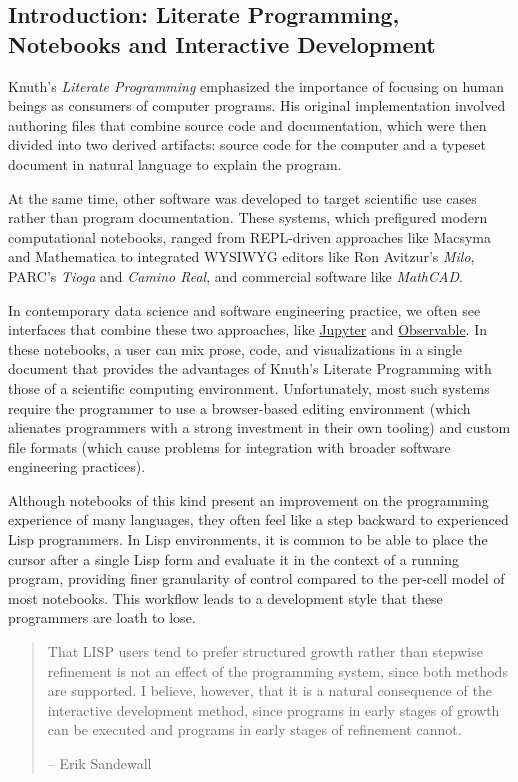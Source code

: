 \documentclass[
]{article}
\begin{document}
\hypertarget{id}{%
\subsection{Introduction: Literate Programming, Notebooks and Interactive Development}\label{id}}

Knuth's \emph{Literate Programming}  emphasized the importance of focusing on human beings as consumers of computer programs. His original implementation involved authoring files that combine source code and documentation, which were then divided into two derived artifacts: source code for the computer and a typeset document in natural language to explain the program.

At the same time, other software was developed to target scientific use cases rather than program documentation. These systems, which prefigured modern computational notebooks, ranged from REPL-driven approaches like Macsyma and Mathematica to integrated WYSIWYG editors like Ron Avitzur's \emph{Milo}, PARC's \emph{Tioga} and \emph{Camino Real}, and commercial software like \emph{MathCAD}.

In contemporary data science and software engineering practice, we often see interfaces that combine these two approaches, like \href{https://jupyter.org}{Jupyter} and \href{https://observablehq.com}{Observable}. In these notebooks, a user can mix prose, code, and visualizations in a single document that provides the advantages of Knuth's Literate Programming with those of a scientific computing environment. Unfortunately, most such systems require the programmer to use a browser-based editing environment (which alienates programmers with a strong investment in their own tooling) and custom file formats (which cause problems for integration with broader software engineering practices).

Although notebooks of this kind present an improvement on the programming experience of many languages, they often feel like a step backward to experienced Lisp programmers. In Lisp environments, it is common to be able to place the cursor after a single Lisp form and evaluate it in the context of a running program, providing finer granularity of control compared to the per-cell model of most notebooks. This workflow leads to a development style that these programmers are loath to lose.

\begin{quote}
That LISP users tend to prefer structured growth rather than stepwise refinement is not an effect of the programming system, since both methods are supported. I believe, however, that it is a natural consequence of the interactive development method, since programs in early stages of growth can be executed and programs in early stages of refinement cannot.

-- Erik Sandewall
\end{quote}
\end{document}
